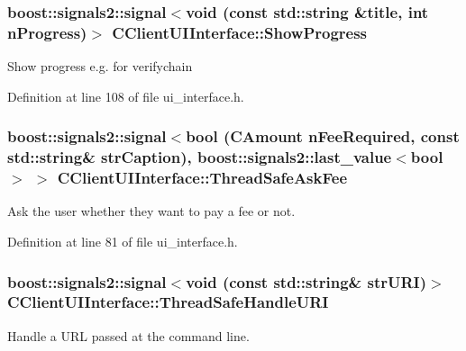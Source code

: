 \hypertarget{class_c_client_u_i_interface_a64e516e507dd74f3639c51dffa645af2}{}
\subsubsection[{Show\+Progress}]{\setlength{\rightskip}{0pt plus 5cm}boost\+::signals2\+::signal$<$void (const std\+::string \&title, int n\+Progress)$>$ C\+Client\+U\+I\+Interface\+::\+Show\+Progress}\label{class_c_client_u_i_interface_a64e516e507dd74f3639c51dffa645af2}
Show progress e.\+g. for verifychain 

Definition at line 108 of file ui\+\_\+interface.\+h.

\hypertarget{class_c_client_u_i_interface_a11db1bca5727c45f52714bc63108ce6a}{}
\subsubsection[{Thread\+Safe\+Ask\+Fee}]{\setlength{\rightskip}{0pt plus 5cm}boost\+::signals2\+::signal$<$bool ({\bf C\+Amount} n\+Fee\+Required, const std\+::string\& str\+Caption), boost\+::signals2\+::last\+\_\+value$<$bool$>$ $>$ C\+Client\+U\+I\+Interface\+::\+Thread\+Safe\+Ask\+Fee}\label{class_c_client_u_i_interface_a11db1bca5727c45f52714bc63108ce6a}
Ask the user whether they want to pay a fee or not. 

Definition at line 81 of file ui\+\_\+interface.\+h.

\hypertarget{class_c_client_u_i_interface_a307f12eb3aadb694a82eb16714441d75}{}
\subsubsection[{Thread\+Safe\+Handle\+U\+R\+I}]{\setlength{\rightskip}{0pt plus 5cm}boost\+::signals2\+::signal$<$void (const std\+::string\& str\+U\+R\+I)$>$ C\+Client\+U\+I\+Interface\+::\+Thread\+Safe\+Handle\+U\+R\+I}\label{class_c_client_u_i_interface_a307f12eb3aadb694a82eb16714441d75}
Handle a U\+R\+L passed at the command line. 

